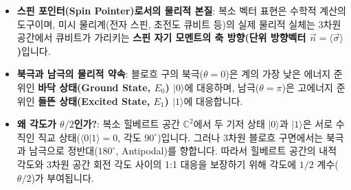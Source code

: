 \documentclass[11pt, a4paper]{article}
\newcommand{\ket}[1]{|#1\rangle}
\newcommand{\braket}[2]{\langle#1|#2\rangle}
\theoremstyle{definition}
\begin{document}
\begin{itemize}
    \item \textbf{스핀 포인터(Spin Pointer)로서의 물리적 본질}:
    복소 벡터 표현은 수학적 계산의 도구이며, 미시 물리계(전자 스핀, 초전도 큐비트 등)의 실제 물리적 실체는 3차원 공간에서 큐비트가 가리키는 \textbf{스핀 자기 모멘트의 축 방향(단위 방향벡터 $\vec{n} = \langle \vec{\sigma} \rangle$)}입니다.
    \item \textbf{북극과 남극의 물리적 약속}:
    블로흐 구의 북극($\theta=0$)은 계의 가장 낮은 에너지 준위인 \textbf{바닥 상태(Ground State, $E_0$) $\ket{0}$}에 대응하며, 남극($\theta=\pi$)은 고에너지 준위인 \textbf{들뜬 상태(Excited State, $E_1$) $\ket{1}$}에 대응합니다.
    \item \textbf{왜 각도가 $\theta/2$인가?}:
    복소 힐베르트 공간 $\mathbb{C}^2$에서 두 기저 상태 $\ket{0}$과 $\ket{1}$은 서로 수직인 직교 상태($\braket{0}{1} = 0$, 각도 $90^\circ$)입니다. 그러나 3차원 블로흐 구면에서는 북극과 남극으로 정반대($180^\circ$, Antipodal)를 향합니다. 따라서 힐베르트 공간의 내적 각도와 3차원 공간 회전 각도 사이의 1:1 대응을 보장하기 위해 각도에 $1/2$ 계수($\theta/2$)가 부여됩니다.
\end{itemize}
\end{document}
